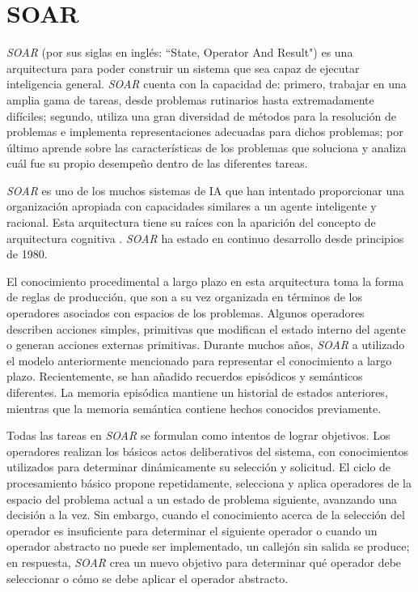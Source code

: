 \section{SOAR}

\emph{SOAR} (por sus siglas en ingl\'{e}s: “State, Operator And Result") es una arquitectura para poder construir un sistema que sea capaz de ejecutar inteligencia general. \emph{SOAR} cuenta con la capacidad de: primero, trabajar en una amplia gama de tareas, desde problemas rutinarios hasta extremadamente dif\'{i}ciles; segundo, utiliza una gran diversidad de m\'{e}todos para la resoluci\'{o}n de problemas e implementa representaciones adecuadas para dichos problemas; por \'{u}ltimo aprende sobre las caracter\'{i}sticas de los problemas que soluciona y analiza cu\'{a}l fue su propio desempe\~no dentro de las diferentes tareas.

 \emph{SOAR} es uno de los muchos sistemas de IA que han intentado proporcionar una organizaci\'{o}n apropiada con capacidades similares a un agente inteligente y racional. Esta arquitectura tiene su raíces con la aparición del concepto de arquitectura cognitiva \cite{newell1973production}.
 \emph{SOAR} ha estado en continuo desarrollo desde principios de 1980. 
 
 El conocimiento procedimental a largo plazo en esta arquitectura toma la forma de reglas de producción, que son a su vez organizada en t\'{e}rminos de los operadores asociados con espacios de los problemas. Algunos operadores describen acciones simples, primitivas que modifican el estado interno del agente o generan acciones externas primitivas. Durante muchos años, \emph{SOAR} a utilizado el modelo anteriormente mencionado para representar el conocimiento a largo plazo. Recientemente, se han añadido recuerdos epis\'{o}dicos y sem\'{a}nticos diferentes. La memoria epis\'{o}dica  mantiene un historial de estados anteriores, mientras que la memoria sem\'{a}ntica contiene hechos conocidos previamente\cite{laird1987soar}.
 
Todas las tareas en \emph{SOAR} se formulan como intentos de lograr objetivos. Los operadores realizan los b\'{a}sicos actos deliberativos del sistema, con conocimientos utilizados para determinar din\'{a}micamente su selección y solicitud. El ciclo de procesamiento b\'{a}sico propone repetidamente, selecciona y aplica operadores de la
espacio del problema actual a un estado de problema siguiente, avanzando una decisi\'{o}n a la vez. Sin embargo, cuando el conocimiento acerca de la selección del operador es insuficiente para determinar el siguiente operador  o cuando un operador abstracto no puede ser implementado, un callejón sin salida se produce; en respuesta, \emph{SOAR} crea un nuevo objetivo para determinar qué operador debe seleccionar o c\'{o}mo se debe aplicar el operador abstracto\cite{langley2009cognitive}.

